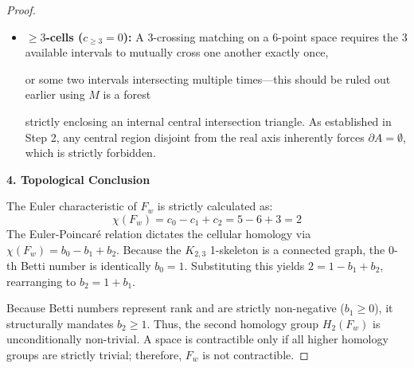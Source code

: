 \documentclass[12pt]{article}
\newcommand{\review}[1]{\begin{reviewbox}#1\end{reviewbox}}
\begin{document}
\begin{proof}
\begin{itemize}
    To rigorously verify $M_3$ independent of geometric ambiguity, we execute an explicit Euler perimeter tour on its tree components. The intervals $\alpha=(1',4')$ and $\gamma=(2',6')$ cross at $c_1$; $\alpha$ and $\beta=(3',5')$ cross at $c_2$. Traversing the right-hand bounding walls of the tree's branches strictly turns at $c_1$ and $c_2$ to remain in the complement space. Originating from $1'$, the Euler tour visits the leaves in exactly the reverse ordered sequence: $1', 6', 5', 4', 3', 2'$. This cyclic boundary visitation proves the complement regions inherently pair $(1',6'), (6',5'), (5',4'), (4',3'), (3',2'), (2',1')$. Every region strictly pairs an Odd index with an Even index (opposite parities), completely satisfying the CW complex boundary conditions despite internal arc nestings. Executing the exact same tree Euler tour algorithm on $M_1$ and $M_2$ yields the identical cyclic leaf sequence. All three are valid 2-cells.
    \item \textbf{$\geq 3$-cells ($c_{\geq 3}=0$):} A 3-crossing matching on a 6-point space requires the 3 available intervals to mutually cross one another exactly once,\review{or some two intervals intersecting multiple times---this should be ruled out earlier using $M$ is a forest} strictly enclosing an internal central intersection triangle. As established in Step 2, any central region disjoint from the real axis inherently forces $\partial A = \emptyset$, which is strictly forbidden. 
\end{itemize}

\vspace{1em}
\noindent\textbf{4. Topological Conclusion}

The Euler characteristic of $F_w$ is strictly calculated as:
\[
\chi(F_w) = c_0 - c_1 + c_2 = 5 - 6 + 3 = 2
\]
The Euler-Poincaré relation dictates the cellular homology via $\chi(F_w) = b_0 - b_1 + b_2$. Because the $K_{2,3}$ 1-skeleton is a connected graph, the 0-th Betti number is identically $b_0 = 1$. Substituting this yields $2 = 1 - b_1 + b_2$, rearranging to $b_2 = 1 + b_1$. 

Because Betti numbers represent rank and are strictly non-negative ($b_1 \geq 0$), it structurally mandates $b_2 \geq 1$. Thus, the second homology group $H_2(F_w)$ is unconditionally non-trivial. A space is contractible only if all higher homology groups are strictly trivial; therefore, $F_w$ is not contractible.
\end{proof}
\end{document}
